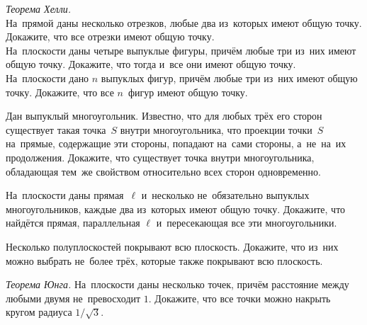 


\begin{problems}

\item\emph{Теорема Хелли.}
\\
\subproblem
На~прямой даны несколько отрезков, любые два из~которых имеют общую точку.
Докажите, что все отрезки имеют общую точку.
\\
\subproblem
На~плоскости даны четыре выпуклые фигуры, причём любые три из~них имеют общую
точку.
Докажите, что тогда и~все они имеют общую точку.
\\
\subproblem
На~плоскости дано $n$ выпуклых фигур, причём любые три из~них имеют общую
точку.
Докажите, что все $n$~фигур имеют общую точку.

\item
Дан выпуклый многоугольник.
Известно, что для любых трёх его сторон существует такая точка~$S$ внутри
многоугольника, что проекции точки~$S$ на~прямые, содержащие эти стороны,
попадают на~сами стороны, а~не~на~их продолжения.
Докажите, что существует точка внутри многоугольника, обладающая тем~же
свойством относительно всех сторон одновременно.

\item
На~плоскости даны прямая~$\ell$ и~несколько не~обязательно выпуклых
многоугольников, каждые два из~которых имеют общую точку.
Докажите, что найдётся прямая, параллельная $\ell$ и~пересекающая все эти
многоугольники.

\item
Несколько полуплоскостей покрывают всю плоскость.
Докажите, что из~них можно выбрать не~более трёх, которые также покрывают всю
плоскость.

\item
\emph{Теорема Юнга.}
На~плоскости даны несколько точек, причём расстояние между любыми двумя
не~превосходит $1$.
Докажите, что все точки можно накрыть кругом радиуса $1 / \sqrt{3}$.



\end{problems}
